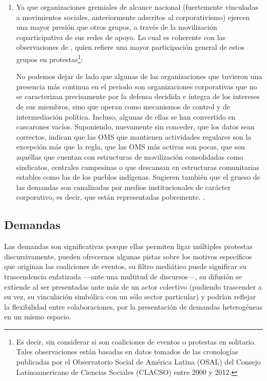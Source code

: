 \documentclass[letterpaper, 11pt]{book}
\theoremstyle{definition}
\theoremstyle{remark}
\begin{document}
\begin{enumerate}
    \item Ya que organizaciones gremiales de alcance nacional (fuertemente vinculadas a movimientos sociales, anteriormente adscritos al corporativismo) ejercen una mayor presión que otros grupos, a través de la movilización coparticipativa de sus redes de apoyo. 
    Lo cual es coherente con las observaciones de \citet{2016_Cadena_OMS}, quien refiere una mayor participación general de estos grupos en protestas\footnote{
	Es decir, sin considerar si son coaliciones de eventos o protestas en solitario. 
	Tales observaciones están basadas en datos tomados de las cronologías publicadas por el Observatorio Social de América Latina (OSAL) del Consejo Latinoamericano de Ciencias Sociales (CLACSO) entre 2000 y 2012. 
    }:
	\begin{center}
	    \begin{minipage}{0.9\linewidth}
		{\setlength{\parindent}{12pt}\small
		No podemos dejar de lado que algunas de las organizaciones que tuvieron una presencia más continua en el periodo son organizaciones corporativas que no se caracterizan precisamente por la defensa decidida e íntegra de los intereses de sus miembros, sino que operan como mecanismos de control y de intermediación política. 
		Incluso, algunas de ellas se han convertido en cascarones vacíos. 
		Suponiendo, nuevamente sin conceder, que los datos sean correctos, indican que las OMS que mantienen actividades regulares son la excepción más que la regla, que las OMS más activas son pocas, que son aquéllas que cuentan con estructuras de movilización consolidadas como sindicatos, centrales campesinas o que descansan en estructuras comunitarias estables como las de los pueblos indígenas. 
		Sugieren también que el grueso de las demandas son canalizadas por medios institucionales de carácter corporativo, es decir, que están representadas pobremente. \normalsize \citep[131]{2016_Cadena_OMS}.
		}
	    \end{minipage}
	\end{center}
\end{enumerate}





\subsection{Demandas}
\label{sec:demandas}

Las demandas son significativas porque ellas 
permiten ligar múltiples protestas discursivamente, 
pueden ofrecernos algunas pistas sobre los motivos específicos que originan las coaliciones de eventos, 
su filtro mediático puede significar su trascendencia enfatizada ---ante una multitud de discursos---, 
su difusión se extiende al ser presentadas ante más de un actor colectivo (pudiendo trascender a su vez, su vinculación simbólica con un sólo sector particular) 
y podrían reflejar la flexibilidad entre colaboraciones, por la presentación de demandas heterogéneas en un mismo espacio. 
\end{document}
